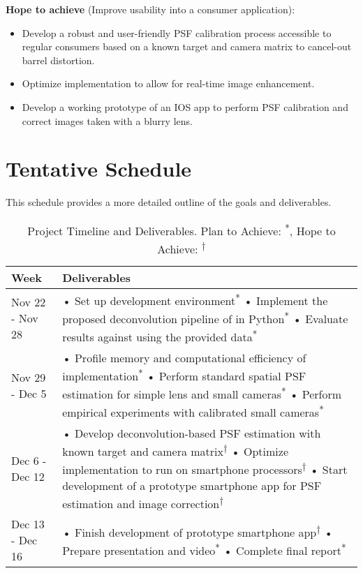 \documentclass{article}
\begin{document}
\textbf{Hope to achieve} (Improve usability into a consumer application):
\begin{itemize}
    \item Develop a robust and user-friendly PSF calibration process accessible to regular consumers based on a known target and camera matrix to cancel-out barrel distortion.
    \item Optimize implementation to allow for real-time image enhancement.
    \item Develop a working prototype of an IOS app to perform PSF calibration and correct images taken with a blurry lens.
\end{itemize}
\section{Tentative Schedule}
This schedule provides a more detailed outline of the goals and deliverables. 
\begin{table}[h]
\centering
\renewcommand{\arraystretch}{1.4}  %
\begin{tabular}{|l|p{14cm}|}
\hline
\textbf{Week} & \textbf{Deliverables} \\
\hline
Nov 22 - Nov 28 & 
• Set up development environment\textsuperscript{*}\newline
• Implement the proposed deconvolution pipeline of \cite{simplelens} in Python\textsuperscript{*}\newline
• Evaluate results against \cite{simplelens} using the provided data\textsuperscript{*}\\
\hline
Nov 29 - Dec 5 & 
• Profile memory and computational efficiency of implementation\textsuperscript{*} \newline
• Perform standard spatial PSF estimation for simple lens and small cameras\textsuperscript{*} \newline
• Perform empirical experiments with calibrated small cameras\textsuperscript{*} \\
\hline 
Dec 6 - Dec 12 & 
• Develop deconvolution-based PSF estimation with known target and camera matrix\textsuperscript{†}\newline
• Optimize implementation to run on smartphone processors\textsuperscript{†} \newline
• Start development of a prototype smartphone app for PSF estimation and image correction\textsuperscript{†}\\
\hline
Dec 13 - Dec 16 & 
• Finish development of prototype smartphone app\textsuperscript{†}\newline
• Prepare presentation and video\textsuperscript{*}\newline
• Complete final report\textsuperscript{*}\\
\hline
\end{tabular}
\caption{Project Timeline and Deliverables. Plan to Achieve: \textsuperscript{*}, Hope to Achieve: \textsuperscript{†}}
\label{tab:schedule}
\end{table}


\clearpage
\printbibliography
\end{document}
